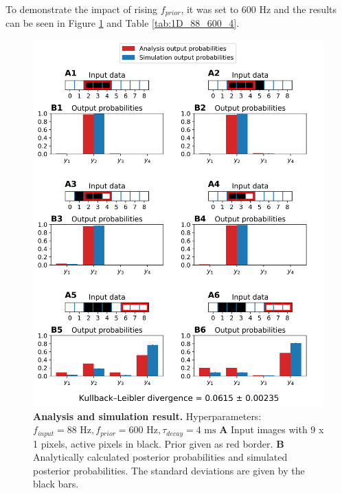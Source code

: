 To demonstrate the impact of rising $f_{prior}$, it was set to 600 Hz and the results can be seen in Figure \ref{fig:1D_88_600_4} and Table \ref{tab:1D_88_600_4}.

\begin{figure}
  \includegraphics[width=\linewidth]{figures/1D/1D_88_600_4.png}
  \caption{\textbf{Analysis and simulation result. } Hyperparameters: $f_{input} = 88\text{ Hz}, f_{prior} = 600\text{ Hz}, \tau_{decay} = 4\text{ ms}$ \textbf{A} Input images with 9 x 1 pixels, active pixels in black. Prior given as red border. \textbf{B} Analytically calculated posterior probabilities and simulated posterior probabilities. The standard deviations are given by the black bars.}
  \label{fig:1D_88_600_4}
\end{figure}

